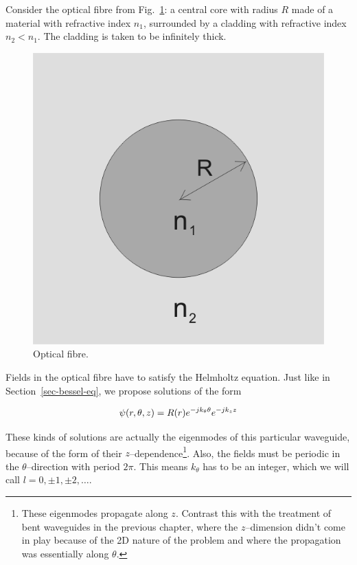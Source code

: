 
Consider the optical fibre from Fig.~\ref{fig-fibre}: a central core with radius $R$ made of a material with refractive index $n_1$, surrounded by a cladding with refractive index $n_2 < n_1$. The cladding is taken to be infinitely thick. 

\begin{figure}
\centering
\includegraphics{special/figures/fibre}
\caption{Optical fibre.}
\label{fig-fibre}
\end{figure}

Fields in the optical fibre have to satisfy the Helmholtz equation. Just like in Section~\ref{sec-bessel-eq}, we propose solutions of the form 

\begin{equation}
\psi(r,\theta,z) = R(r)e^{-j k_\theta \theta }e^{-j k_z z} \\
\end{equation}  

These kinds of solutions are actually the eigenmodes of this particular waveguide, because of the form of their $z$--dependence\footnote{These eigenmodes propagate along $z$. Contrast this with the treatment of bent waveguides in the previous chapter, where the $z$--dimension didn't come in play because of the 2D nature of the problem and where the propagation was essentially along $\theta$.}.  Also, the fields must be periodic in the $\theta$--direction with period $2 \pi$. This means $k_\theta$ has to be an integer, which we will call $l = 0, \pm 1, \pm 2, \ldots$.

